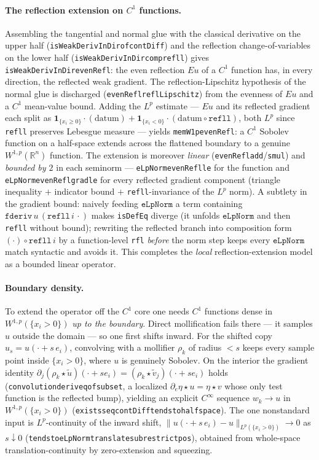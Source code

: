 ﻿\documentclass[12pt, a4paper]{article}
\renewcommand{\_}{\origunderscore\allowbreak}
\theoremstyle{definition}
\theoremstyle{plain}
\begin{document}
\paragraph{The reflection extension on $C^1$ functions.}  Assembling the tangential and normal glue
with the classical derivative on the upper half (\texttt{isWeakDerivInDir\_of\_contDiff}) and the reflection
change-of-variables on the lower half (\texttt{isWeakDerivInDir\_comp\_refll}) gives
\texttt{isWeakDerivInDir\_evenRefl}: the even reflection $Eu$ of a $C^1$ function has, in every
direction, the reflected weak gradient.  The reflection-Lipschitz hypothesis of the normal glue is
discharged (\texttt{evenRefl\_reflLipschitz}) from the evenness of $Eu$ and a $C^1$ mean-value bound.
Adding the $L^p$ estimate --- $Eu$ and its reflected gradient each split as
$\mathbf 1_{\{x_i\ge0\}}\!\cdot(\text{datum})+\mathbf 1_{\{x_i<0\}}\!\cdot(\text{datum}\circ\texttt{refll})$,
both $L^p$ since \texttt{refll} preserves Lebesgue measure --- yields \texttt{memW1p\_evenRefl}: a
$C^1$ Sobolev function on a half-space extends across the flattened boundary to a genuine
$W^{1,p}(\mathbb{R}^n)$ function.  The extension is moreover \emph{linear}
(\texttt{evenRefl\_add}/\texttt{\_smul}) and \emph{bounded by $2$} in each seminorm ---
\texttt{eLpNorm\_evenRefl\_le} for the function and \texttt{eLpNorm\_evenRefl\_grad\_le} for every
reflected gradient component (triangle inequality $+$ indicator bound $+$ \texttt{refll}-invariance of
the $L^p$ norm).  A subtlety in the gradient bound: naively feeding $\texttt{eLpNorm}$ a term
containing $\texttt{fderiv}\,u\,(\texttt{refll}\,i\,\cdot)$ makes \texttt{isDefEq} diverge (it unfolds
$\texttt{eLpNorm}$ and then \texttt{refll} without bound); rewriting the reflected branch into
composition form $(\cdot)\circ\texttt{refll}\,i$ by a function-level \texttt{rfl} \emph{before} the
norm step keeps every $\texttt{eLpNorm}$ match syntactic and avoids it.  This completes the
\emph{local} reflection-extension model as a bounded linear operator.

\paragraph{Boundary density.}  To extend the operator off the $C^1$ core one needs $C^1$ functions
dense in $W^{1,p}(\{x_i>0\})$ \emph{up to the boundary}.  Direct mollification fails there --- it
samples $u$ outside the domain --- so one first shifts inward.  For the shifted copy
$u_s=u(\cdot+s\,e_i)$, convolving with a mollifier $\rho_k$ of radius $<s$ keeps every sample point
inside $\{x_i>0\}$, where $u$ is genuinely Sobolev.  On the interior the gradient identity
$\partial_j(\rho_k\star\tilde u)(\cdot+s e_i)=(\rho_k\star\tilde v_j)(\cdot+s e_i)$ holds
(\texttt{convolution\_deriv\_eq\_of\_subset}, a localized $\partial_e\eta\star u=\eta\star v$ whose only
test function is the reflected bump), yielding an explicit $C^\infty$ sequence $w_k\to u$ in
$W^{1,p}(\{x_i>0\})$ (\texttt{exists\_seq\_contDiff\_tendsto\_halfspace}).  The one nonstandard input is
$L^p$-continuity of the inward shift, $\|u(\cdot+s\,e_i)-u\|_{L^p(\{x_i>0\})}\to0$ as $s\downarrow0$
(\texttt{tendsto\_eLpNorm\_translate\_sub\_restrict\_pos}), obtained from whole-space
translation-continuity by zero-extension and squeezing.
\end{document}
